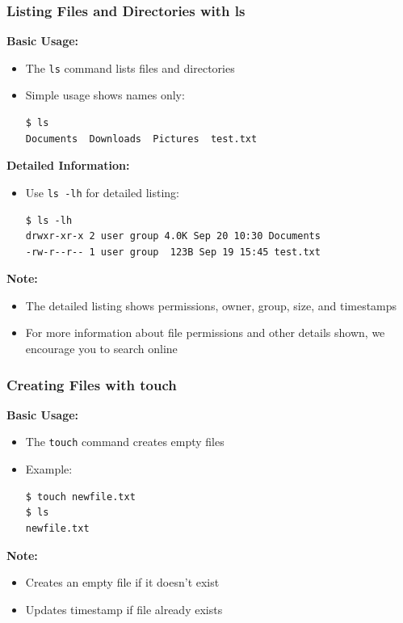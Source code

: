 \documentclass[10pt]{beamer}
\begin{document}
\begin{frame}[fragile]
    \frametitle{Listing Files and Directories with ls}
    
    \textbf{Basic Usage:}
    \begin{itemize}
        \item The \colorbox{gray!20}{\texttt{ls}} command lists files and directories
        \item Simple usage shows names only:
\begin{verbatim}
$ ls
Documents  Downloads  Pictures  test.txt
\end{verbatim}
    \end{itemize}

    \textbf{Detailed Information:}
    \begin{itemize}
        \item Use \colorbox{gray!20}{\texttt{ls -lh}} for detailed listing:
\begin{verbatim}
$ ls -lh
drwxr-xr-x 2 user group 4.0K Sep 20 10:30 Documents
-rw-r--r-- 1 user group  123B Sep 19 15:45 test.txt
\end{verbatim}
    \end{itemize}

    \textbf{Note:}
    \begin{itemize}
        \item The detailed listing shows permissions, owner, group, size, and timestamps
        \item For more information about file permissions and other details shown, we encourage you to search online
    \end{itemize}
\end{frame}

\begin{frame}[fragile]
    \frametitle{Creating Files with touch}
    
    \textbf{Basic Usage:}
    \begin{itemize}
        \item The \colorbox{gray!20}{\texttt{touch}} command creates empty files
        \item Example:
\begin{verbatim}
$ touch newfile.txt
$ ls
newfile.txt
\end{verbatim}
    \end{itemize}

    \textbf{Note:}
    \begin{itemize}
        \item Creates an empty file if it doesn't exist
        \item Updates timestamp if file already exists
    \end{itemize}
\end{frame}
\end{document}
